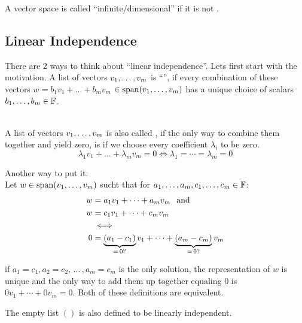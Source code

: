 \setcounter{thm}{12}
\begin{mydef}
  A vector space is called ``infinite\-/dimensional'' if it is not \fd. 
\end{mydef}


\subsection{Linear Independence}

\setcounter{thm}{14}
\begin{mydef} 
  There are $2$ ways to think about ``linear independence''. Lets first start with the motivation. A list of vectors $v_1, \dots, v_m$ is ``\lid'', if every combination of these vectors $w = b_1v_1 + \dots+ b_mv_m$ $\in \operatorname{span} (v_1, \dots, v_m)$ has a unique choice of scalars $b_1, \dots, b_m \in \mathbb{F}$.

   \\
  A list of vectors $v_1, \dots, v_m$ is also called \lid, if the only way to combine them together and yield zero, is if we choose every coefficient $\lambda_i$ to be zero.
  \begin{equation}
    \lambda_1v_1 + \dots + \lambda_mv_m = 0 \iff \lambda_1 = \cdots = \lambda_m = 0
  \end{equation}

  Another way to put it:\\
  Let $w\in \operatorname{span} (v_1, \dots, v_m)$ sucht that for $a_1, \dots, a_m, c_1, \dots, c_m \in \mathbb{F}$:
  \begin{equation}
    \begin{aligned}
      w & =a_1 v_1 + \cdots + a_m v_m \;\;\, \text{and}\;\; \\
      w & =c_1 v_1 + \cdots + c_m v_m \\
      & \iff \\
      0 & = \underbrace{(a_1 - c_1)}_{= \, 0\text{?}} v_1 + \cdots + \underbrace{(a_m -c_m)}_{= \, 0\text{?}} v_m
    \end{aligned}
  \end{equation}

  if $a_1 = c_1, a_2 = c_2, \, \dots \, , a_m = c_m$ is the only solution, the representation of $w$ is unique and the only way to add them up together equaling $0$ is $0v_1+\cdots+0v_m=0$. Both of these definitions are equivalent.

  The empty list $()$ is also defined to be linearly independent.
\end{mydef}




